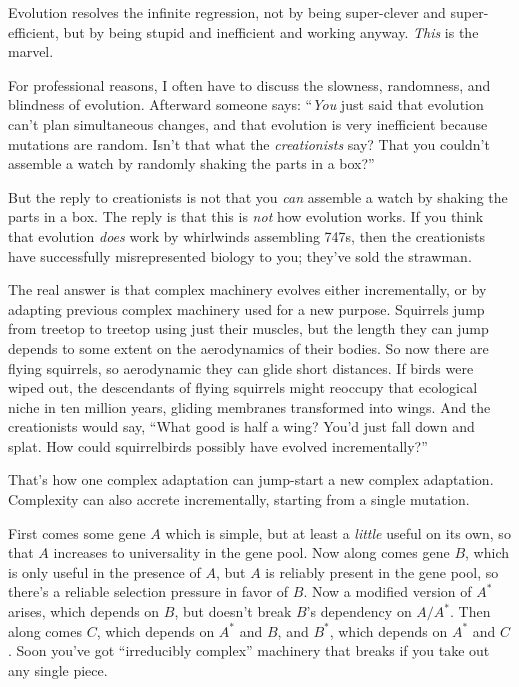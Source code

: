 {
 Evolution resolves the infinite regression, not by being
super-clever and super-efficient, but by being stupid and inefficient
and working anyway. \textit{This} is the marvel.}

{
 For professional reasons, I often have to discuss the slowness,
randomness, and blindness of evolution. Afterward someone says:
``\textit{You} just said that evolution
can't plan simultaneous changes, and that evolution is
very inefficient because mutations are random. Isn't
that what the \textit{creationists} say? That you
couldn't assemble a watch by randomly shaking the parts
in a box?''}

{
 But the reply to creationists is not that you \textit{can}
assemble a watch by shaking the parts in a box. The reply is that this
is \textit{not} how evolution works. If you think that evolution
\textit{does} work by whirlwinds assembling 747s, then the creationists
have successfully misrepresented biology to you;
they've sold the strawman.}

{
 The real answer is that complex machinery evolves either
incrementally, or by adapting previous complex machinery used for a new
purpose. Squirrels jump from treetop to treetop using just their
muscles, but the length they can jump depends to some extent on the
aerodynamics of their bodies. So now there are flying squirrels, so
aerodynamic they can glide short distances. If birds were wiped out,
the descendants of flying squirrels might reoccupy that ecological
niche in ten million years, gliding membranes transformed into wings.
And the creationists would say, ``What good is half a
wing? You'd just fall down and splat. How could
squirrelbirds possibly have evolved incrementally?''}

{
 That's how one complex adaptation can jump-start a
new complex adaptation. Complexity can also accrete incrementally,
starting from a single mutation.}

{
 First comes some gene $A$ which is simple, but at least a
\textit{little} useful on its own, so that $A$ increases to universality
in the gene pool. Now along comes gene $B$, which is only useful in the
presence of $A$, but $A$ is reliably present in the gene pool, so
there's a reliable selection pressure in favor of $B$.
Now a modified version of $A^{*}$ arises, which depends on
$B$, but doesn't break $B$'s dependency on
$A/A^{*}$. Then along comes $C$, which depends on
$A^{*}$ and $B$, and $B^{*}$, which depends on
$A^{*}$ and $C$. Soon you've got
``irreducibly complex'' machinery
that breaks if you take out any single piece.}

